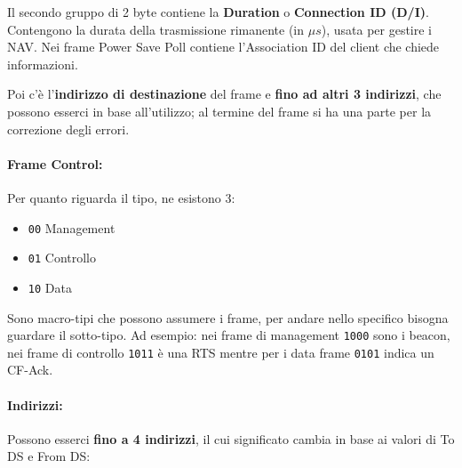 Il secondo gruppo di 2 byte contiene la \textbf{Duration} o \textbf{Connection ID (D/I)}. Contengono la durata della trasmissione rimanente (in $\mu s$), usata per gestire i NAV. Nei frame Power Save Poll contiene l'Association ID del client che chiede informazioni.

Poi c'è l'\textbf{indirizzo di destinazione} del frame e \textbf{fino ad altri 3 indirizzi}, che possono esserci in base all'utilizzo; al termine del frame si ha una parte per la correzione degli errori. 

\paragraph{Frame Control:} Per quanto riguarda il tipo, ne esistono 3:
\begin{itemize}
	\item \texttt{00} Management

	\item \texttt{01} Controllo

	\item \texttt{10} Data
\end{itemize}

Sono macro-tipi che possono assumere i frame, per andare nello specifico bisogna guardare il sotto-tipo.  Ad esempio: nei frame di management \texttt{1000} sono i beacon, nei frame di controllo \texttt{1011} è una RTS mentre per i data frame \texttt{0101} indica un CF-Ack.

\paragraph{Indirizzi:} Possono esserci \textbf{fino a 4 indirizzi}, il cui significato cambia in base ai valori di To DS e From DS:

